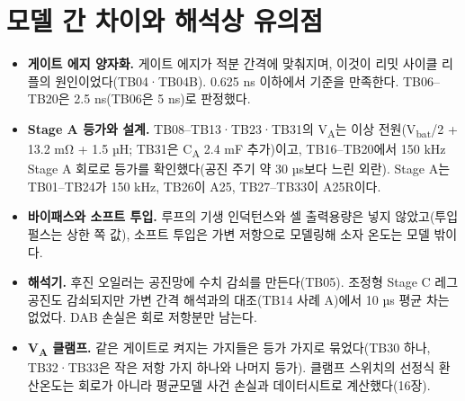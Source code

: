 \section{모델 간 차이와 해석상 유의점}

\begin{itemize}
\item \textbf{게이트 에지 양자화.} 게이트 에지가 적분 간격에 맞춰지며, 이것이 리밋 사이클 리플의 원인이었다(TB04·TB04B). 0.625 ns 이하에서 기준을 만족한다. TB06–TB20은 2.5 ns(TB06은 5 ns)로 판정했다.
\item \textbf{Stage A 등가와 설계.} TB08–TB13·TB23·TB31의 V\textsubscript{A}는 이상 전원(V\textsubscript{bat}/2 + 13.2 mΩ + 1.5 µH; TB31은 C\textsubscript{A} 2.4 mF 추가)이고, TB16–TB20에서 150 kHz Stage A 회로로 등가를 확인했다(공진 주기 약 30 µs보다 느린 외란). Stage A는 TB01–TB24가 150 kHz, TB26이 A25, TB27–TB33이 A25R이다.
\item \textbf{바이패스와 소프트 투입.} 루프의 기생 인덕턴스와 셀 출력용량은 넣지 않았고(투입 펄스는 상한 쪽 값), 소프트 투입은 가변 저항으로 모델링해 소자 온도는 모델 밖이다.
\item \textbf{해석기.} 후진 오일러는 공진망에 수치 감쇠를 만든다(TB05). 조정형 Stage C 레그 공진도 감쇠되지만 가변 간격 해석과의 대조(TB14 사례 A)에서 10 µs 평균 차는 없었다. DAB 손실은 회로 저항분만 남는다.
\item \textbf{V\textsubscript{A} 클램프.} 같은 게이트로 켜지는 가지들은 등가 가지로 묶었다(TB30 하나, TB32·TB33은 작은 저항 가지 하나와 나머지 등가). 클램프 스위치의 선정식 환산온도는 회로가 아니라 평균모델 사건 손실과 데이터시트로 계산했다(16장).
\end{itemize}
